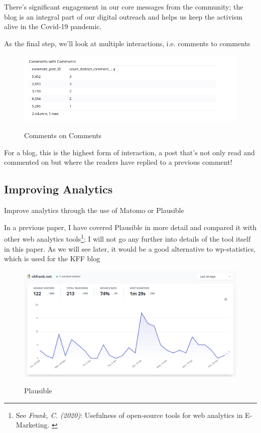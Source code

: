 There's significant engagement in our core messages from the community; the blog is an integral part of our digital outreach and helps us keep the activism alive in the Covid-19 pandemic.

As the final step, we'll look at multiple interactions, i.e. comments to comments

\begin{figure}[H]
\centering
\caption {Comments on Comments}
\includegraphics[width=\linewidth]{images/figure19.png}
\label{fig:commentsComment}
\end{figure}

For a blog, this is the highest form of interaction, a post that's not only read and commented on but where the readers have replied to a previous comment! 

\subsection{Improving Analytics}

Improve analytics through the use of Matomo or Plausible

In a previous paper, I have covered Plausible in more detail and compared it with other web analytics tools\footnote{See \textit{Frank, C. (2020)}: Usefulness of open-source tools for web analytics in E-Marketing. \cite{previousPaper}}; I will not go any further into details of the tool itself in this paper. As we will see later, it would be a good alternative to wp-statistics, which is used for the KFF blog

\begin{figure}[H]
\centering
\caption {Plausible}
\includegraphics[width=\linewidth]{images/plausible.png}
\label{fig:plausible}
\end{figure}

